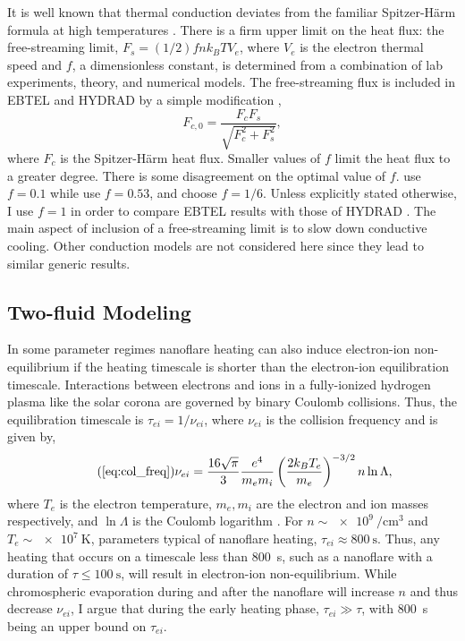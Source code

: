 It is well known that thermal conduction deviates from the familiar Spitzer-H{\"a}rm formula \citep{spitzer_transport_1953} at high temperatures \citep[e.g.][]{ljepojevic_heat_1989}. There is a firm upper limit on the heat flux: the free-streaming limit, $F_s=(1/2)fnk_BTV_e$, where $V_e$ is the electron thermal speed and $f$, a dimensionless constant, is determined from a combination of lab experiments, theory, and numerical models. The free-streaming flux is included in EBTEL and HYDRAD by a simple modification \citep{klimchuk_highly_2008},
\begin{equation}
    F_{c,0} = \frac{F_cF_s}{\sqrt{F_c^2 + F_s^2}},
\end{equation}
where $F_c$ is the Spitzer-H{\"a}rm heat flux. Smaller values of $f$ limit the heat flux to a greater degree. There is some disagreement on the optimal value of $f$. \citet{luciani_nonlocal_1983} use $f=0.1$ while \citet{karpen_nonlocal_1987} use $f=0.53$, and \citet{patsourakos_coronal_2005} choose $f=1/6$. Unless explicitly stated otherwise, I use $f = 1$ in order to compare EBTEL results with those of HYDRAD \citep[see appendix of][]{bradshaw_influence_2013}. The main aspect of inclusion of a free-streaming limit is to slow down conductive cooling. Other conduction models \citep[e.g. the non-local model discussed in the coronal context by][]{karpen_nonlocal_1987,ciaravella_non-local_1991,west_lifetime_2008} are not considered here since they lead to similar generic results.

\subsection{Two-fluid Modeling}\label{hot-plasma:subsec:two_fluid_theory}
    
In some parameter regimes nanoflare heating can also induce electron-ion non-equilibrium if the heating timescale is shorter than the electron-ion equilibration timescale. Interactions between electrons and ions in a fully-ionized hydrogen plasma like the solar corona are governed by binary Coulomb collisions. Thus, the equilibration timescale is $\tau_{ei}=1/\nu_{ei}$, where $\nu_{ei}$ is the collision frequency and is given by,
\begin{equation}\tag{\ref{eq:col_freq}}
    \nu_{ei} = \frac{16\sqrt{\pi}}{3}\frac{e^4}{m_em_i}\left(\frac{2k_BT_e}{m_e}\right)^{-3/2}n\ln{\Lambda},
\end{equation}
where $T_e$ is the electron temperature, $m_e,m_i$ are the electron and ion masses respectively, and $\ln{\Lambda}$ is the Coulomb logarithm \citep[see both Equation 2.5e and Section 3 of][]{braginskii_transport_1965}. For $n\sim\SI{e9}{\per\cubic\cm}$ and $T_e\sim\SI{e7}{\kelvin}$, parameters typical of nanoflare heating, $\tau_{ei}\approx\SI{800}{\second}$. Thus, any heating that occurs on a timescale less than \SI{800}{\second}, such as a nanoflare with a duration of $\tau\le\SI{100}{\second}$, will result in electron-ion non-equilibrium. While chromospheric evaporation during and after the nanoflare will increase $n$ and thus decrease $\nu_{ei}$, I argue that during the early heating phase, $\tau_{ei}\gg\tau$, with \SI{800}{\second} being an upper bound on $\tau_{ei}$.

